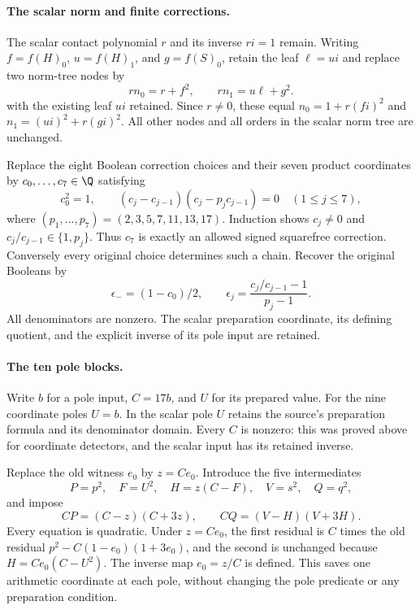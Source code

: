 \paragraph{The scalar norm and finite corrections.}
The scalar contact polynomial $r$ and its inverse $ri=1$ remain.
Writing $f=f(H)_0$, $u=f(H)_1$, and $g=f(S)_0$, retain the leaf
$\ell=ui$ and replace two norm-tree
nodes by
\[
 rn_0=r+f^2,\qquad rn_1=u\ell+g^2.
\]
with the existing leaf $ui$ retained. Since $r\ne0$, these equal
$n_0=1+r(fi)^2$ and $n_1=(ui)^2+r(gi)^2$. All other nodes and all
orders in the scalar norm tree are unchanged.

Replace the eight Boolean correction choices and their seven product
coordinates by $c_0,\ldots,c_7\in\Q$ satisfying
\begin{equation}\label{eq:v6-correction-chain}
 c_0^2=1,\qquad
 (c_j-c_{j-1})(c_j-p_jc_{j-1})=0\quad(1\le j\le7),
\end{equation}
where $(p_1,\ldots,p_7)=(2,3,5,7,11,13,17)$. Induction shows
$c_j\ne0$ and $c_j/c_{j-1}\in\{1,p_j\}$. Thus $c_7$ is exactly an
allowed signed squarefree correction. Conversely every original
choice determines such a chain. Recover the original Booleans by
\[
 \epsilon_-=(1-c_0)/2,\qquad
 \epsilon_j=\frac{c_j/c_{j-1}-1}{p_j-1}.
\]
All denominators are nonzero. The scalar preparation coordinate,
its defining quotient, and the explicit inverse of its pole input
are retained.

\paragraph{The ten pole blocks.}
Write $b$ for a pole input, $C=17b$, and $U$ for its prepared value.
For the nine coordinate poles $U=b$. In the scalar pole $U$ retains
the source's preparation formula and its denominator domain.
Every $C$ is nonzero: this was proved above for coordinate detectors,
and the scalar input has its retained inverse.

Replace the old witness $e_0$ by $z=Ce_0$. Introduce the five
intermediates
\[
 P=p^2,\quad F=U^2,\quad H=z(C-F),\quad V=s^2,\quad Q=q^2,
\]
and impose
\begin{equation}\label{eq:v6-scaled-poles}
 CP=(C-z)(C+3z),\qquad CQ=(V-H)(V+3H).
\end{equation}
Every equation is quadratic. Under $z=Ce_0$, the first residual is
$C$ times the old residual $p^2-C(1-e_0)(1+3e_0)$, and the second
is unchanged because $H=Ce_0(C-U^2)$. The inverse map $e_0=z/C$
is defined. This saves one arithmetic coordinate at each pole,
without changing the pole predicate or any preparation condition.

